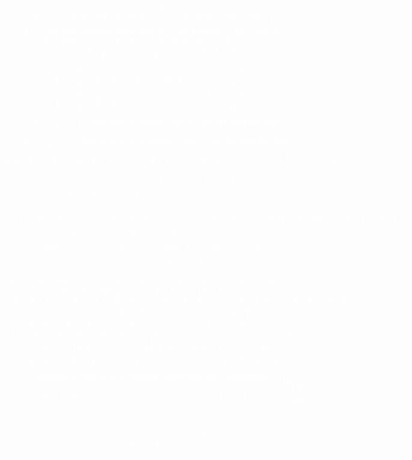 \documentclass[12pt,portrait,semhelv,semrot]{article}
\begin{document}
\normalsize

\textcolor{white}{\textbf{
$$\boldsymbol{t~~~~~n_t}$$
$$\boldsymbol{Y_1 = \mbox{\# of ionized bulbs that are marketable}\sim Bin(180, p_1)}$$
$$\boldsymbol{Y_2 = \mbox{\# of non-ionized bulbs that are marketable}\sim Bin(180, p_2)}$$
$$\boldsymbol{Y\sim Bin(n,p)~~~~~E(Y)=np~~~~Var(Y)=np(1-p)}$$
$$\boldsymbol{\hat{p}= \frac{Y}{n} ~~~~E(\hat{p}) = p~~~~~Var(\hat{p}) =\frac{p(1-p)}{n}}$$
$$\boldsymbol{\hat{p}_1= \frac{Y_1}{n_1} ~~~~E(\hat{p}_1) = p_1~~~~~Var(\hat{p}_1) =\frac{p_1(1-p_1)}{n_1}}$$
$$\boldsymbol{\hat{p}_2= \frac{Y_2}{n_2} ~~~~E(\hat{p}_2) = p_2~~~~~Var(\hat{p}_2) =\frac{p_2(1-p_2)}{n_2}}$$
$$\boldsymbol{\hat{p}_1 = \frac{Y_1}{n_1} =\mbox{Proportion of ionized bulbs that are marketable}}$$
$$\boldsymbol{\hat{p}_2 = \frac{Y_2}{n_2} =\mbox{Proportion of non-ionized bulbs that are marketable}}$$
$$\boldsymbol{Var(Y) =E\left((Y-E(Y))^2\right) =  E(Y^2) - (E(Y))^2 = \sum_{y=0}^{n}y^2\binom{n}{y}p^y(1-p)^{n-y} - (np)^2}$$
$$\boldsymbol{f_{Y_1,Y_2}(y_1,y_2) = f_{Y_1}(y_1)f_{Y_2}(y_2)=f(y_1)f(y_2)}$$
$$\boldsymbol{E(Y_1Y_2) = \int\int y_1y_2f_{Y_1,Y_2}(y_1,y_2)dy_1dy_2}$$
$$\boldsymbol{= \int\int y_1y_2f_{Y_1}(y_1)f_{Y_2}(y_2)dy_1dy_2 = \left(\int y_1 f_{Y_1}(y_1)dy_1\right)\left(\int y_2f_{Y_2}(y_2)dy_2\right) = E(Y_1)E(Y_2)}$$
$$\boldsymbol{E\left(\hat{p}_1-\hat{p}_2\right) = E\left(\hat{p}_1\right)-E\left(\hat{p}_2\right) = p_1-p_2}$$
$$\boldsymbol{Var(\hat{p}_1-\hat{p}_2) = Var(\hat{p}_1) + Var(\hat{p_2}) -2Cov(\hat{p}_1,\hat{p}_2)}$$
$$\boldsymbol{= \frac{p_1(1-p_1)}{n_1}+\frac{p_2(1-p_2)}{n_2}}$$
$$\boldsymbol{Var(aY_1+bY_2 + c) = a^2Var(Y_1)+b^2Var(Y_2) + 2abCov(Y_1,Y_2)}$$
$$\boldsymbol{E(aY_1+bY_2+c) = aE(Y_1) + bE(Y_2) + c}$$
$$\boldsymbol{Cov(Y_1,Y_2) = E\left[(Y_1-E(Y_1))(Y_2-E(Y_2))\right] = E(Y_1Y_2)-E(Y_1)E(Y_2)}$$
$$\boldsymbol{Cov(Y_1,Y_1) = E\left[(Y_1-E(Y_1))^2\right] = Var(Y_1)}$$
$$\boldsymbol{E(Y_1+Y_2+Y_3+Y_4+Y_5) = p +p+p+p+p = 5p ~~~~~(np)}$$
$$\boldsymbol{Var(Y_1+Y_2+Y_3+Y_4+Y_5) = p^2+p^2+p^2+p^2+p^2 = 5p^2 ~~~~~(np^2)}$$
$$\boldsymbol{n_1\hat{p}_1\geq 10, n_1(1-\hat{p}_1)\geq 10, n_2\hat{p}_2\geq 10, n_2(1-\hat{p}_2)\geq 10}$$
$$\boldsymbol{Cov(\hat{p}_1,\hat{p}_2) = E\left((\hat{p}_1-p_1)(\hat{p}_2-p_2)\right) = E(\hat{p}_1-p_1)E(\hat{p}_2-p_2)=0}$$
$$\boldsymbol{\hat{p}_1 = \mbox{Sample proportion of ionized bulbs that are marketable} = \frac{153}{180}}$$
$$\boldsymbol{\hat{p}_2 = \mbox{Sample proportion of non-ionized bulbs that are marketable} = \frac{119}{180}}$$
$$\boldsymbol{\hat{p}_1-\hat{p}_2}$$
$$\boldsymbol{\neq}$$
$$\boldsymbol{Z = \frac{\hat{p}_1-\hat{p}_2}{\sqrt{\hat{p}(1-\hat{p})(\frac{1}{n_1}+\frac{1}{n_2})}}}$$
}}
\end{document}
